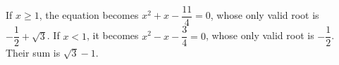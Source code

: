 If $x\ge1$, the equation becomes $x^2+x-\dfrac{11}{4}=0$, whose only valid root is $-\dfrac{1}{2}+\sqrt3$. If $x<1$, it becomes $x^2-x-\dfrac{3}{4}=0$, whose only valid root is $-\dfrac{1}{2}$. Their sum is $\boxed{\sqrt3-1}$.

